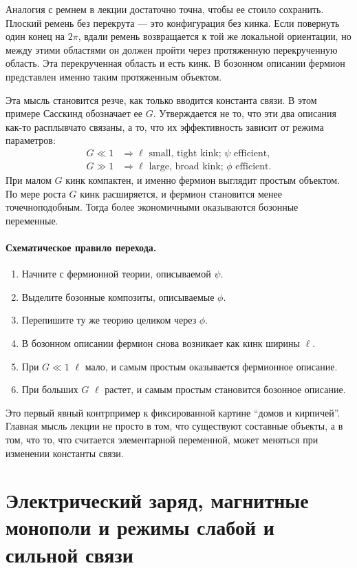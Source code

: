 Аналогия с ремнем в лекции достаточно точна, чтобы ее стоило сохранить. Плоский ремень без перекрута — это конфигурация без кинка. Если повернуть один конец на \(2\pi\), вдали ремень возвращается к той же локальной ориентации, но между этими областями он должен пройти через протяженную перекрученную область. Эта перекрученная область и есть кинк. В бозонном описании фермион представлен именно таким протяженным объектом.

Эта мысль становится резче, как только вводится константа связи. В этом примере Сасскинд обозначает ее \(G\). Утверждается не то, что эти два описания как-то расплывчато связаны, а то, что их эффективность зависит от режима параметров:
\begin{align}
G \ll 1
&\Rightarrow
\ell\text{ small, tight kink; }\psi\text{ efficient},\\
G \gg 1
&\Rightarrow
\ell\text{ large, broad kink; }\phi\text{ efficient}.
\end{align}
При малом \(G\) кинк компактен, и именно фермион выглядит простым объектом. По мере роста \(G\) кинк расширяется, и фермион становится менее точечноподобным. Тогда более экономичными оказываются бозонные переменные.

\paragraph{Схематическое правило перехода.}
\begin{enumerate}
\item Начните с фермионной теории, описываемой \(\psi\).
\item Выделите бозонные композиты, описываемые \(\phi\).
\item Перепишите ту же теорию целиком через \(\phi\).
\item В бозонном описании фермион снова возникает как кинк ширины \(\ell\).
\item При \(G\ll 1\) \(\ell\) мало, и самым простым оказывается фермионное описание.
\item При больших \(G\) \(\ell\) растет, и самым простым становится бозонное описание.
\end{enumerate}

Это первый явный контрпример к фиксированной картине ``домов и кирпичей''. Главная мысль лекции не просто в том, что существуют составные объекты, а в том, что то, что считается элементарной переменной, может меняться при изменении константы связи.

\section{Электрический заряд, магнитные монополи и режимы слабой и сильной связи}

